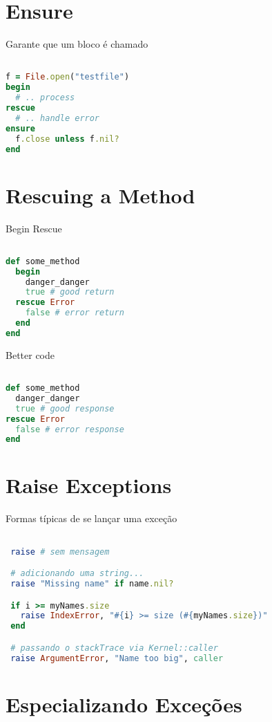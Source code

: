 \documentclass[serif,mathserif]{book}
\begin{document}
\section{Ensure}

Garante que um bloco é chamado

\begin{lstlisting}[language=ruby]

f = File.open("testfile")
begin
  # .. process
rescue
  # .. handle error
ensure
  f.close unless f.nil?
end
\end{lstlisting}

\section{Rescuing a Method}

Begin Rescue

\begin{lstlisting}[language=ruby]

def some_method
  begin
    danger_danger
    true # good return
  rescue Error
    false # error return
  end
end
\end{lstlisting}

Better code

\begin{lstlisting}[language=ruby]

def some_method
  danger_danger
  true # good response
rescue Error
  false # error response
end
\end{lstlisting}

\section{Raise Exceptions}

Formas típicas de se lançar uma exceção

\begin{lstlisting}[language=ruby]

 raise # sem mensagem

 # adicionando uma string...
 raise "Missing name" if name.nil?

 if i >= myNames.size
   raise IndexError, "#{i} >= size (#{myNames.size})"
 end

 # passando o stackTrace via Kernel::caller
 raise ArgumentError, "Name too big", caller
\end{lstlisting}

\section{Especializando Exceções}
\end{document}
